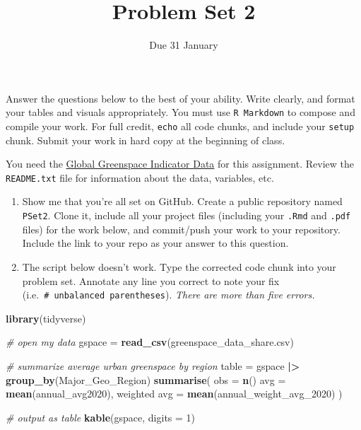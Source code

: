 \documentclass[
  12pt,
]{article}
\title{Problem Set 2}
\author{Due 31 January}
\date{}
\newenvironment{Shaded}{\begin{snugshade}}{\end{snugshade}}
\newcommand{\AttributeTok}[1]{\textcolor[rgb]{0.13,0.29,0.53}{#1}}
\newcommand{\CommentTok}[1]{\textcolor[rgb]{0.56,0.35,0.01}{\textit{#1}}}
\newcommand{\DecValTok}[1]{\textcolor[rgb]{0.00,0.00,0.81}{#1}}
\newcommand{\FunctionTok}[1]{\textcolor[rgb]{0.13,0.29,0.53}{\textbf{#1}}}
\newcommand{\NormalTok}[1]{#1}
\newcommand{\OtherTok}[1]{\textcolor[rgb]{0.56,0.35,0.01}{#1}}
\newcommand{\SpecialCharTok}[1]{\textcolor[rgb]{0.81,0.36,0.00}{\textbf{#1}}}
\begin{document}
\maketitle

Answer the questions below to the best of your ability. Write clearly,
and format your tables and visuals appropriately. You must use
\texttt{R\ Markdown} to compose and compile your work. For full credit,
\texttt{echo} all code chunks, and include your \texttt{setup} chunk.
Submit your work in hard copy at the beginning of class.

You need the
\href{https://dataverse.harvard.edu/dataset.xhtml?persistentId=doi:10.7910/DVN/TMWYHB}{Global
Greenspace Indicator Data} for this assignment. Review the
\texttt{README.txt} file for information about the data, variables, etc.

\begin{enumerate}
\def\labelenumi{\arabic{enumi}.}
\item
  Show me that you're all set on GitHub. Create a public repository
  named \texttt{PSet2}. Clone it, include all your project files
  (including your \texttt{.Rmd} and \texttt{.pdf} files) for the work
  below, and commit/push your work to your repository. Include the link
  to your repo as your answer to this question.
\item
  The script below doesn't work. Type the corrected code chunk into your
  problem set. Annotate any line you correct to note your fix
  (i.e.~\texttt{\#\ unbalanced\ parentheses}). \emph{There are more than
  five errors.}
\end{enumerate}

\begin{Shaded}
\begin{Highlighting}[]
  \FunctionTok{library}\NormalTok{(tidyverse)}

\CommentTok{\# open my data}
\NormalTok{  gspace }\OtherTok{=} \FunctionTok{read\_csv}\NormalTok{(greenspace\_data\_share.csv)}

\CommentTok{\# summarize average urban greenspace by region}
\NormalTok{  table }\OtherTok{=} 
\NormalTok{    gspace }\SpecialCharTok{|\textgreater{}}
    \FunctionTok{group\_by}\NormalTok{(Major\_Geo\_Region)}
    \FunctionTok{summarise}\NormalTok{(}
      \AttributeTok{obs =} \FunctionTok{n}\NormalTok{()}
      \AttributeTok{avg =} \FunctionTok{mean}\NormalTok{(annual\_avg2020),}
\NormalTok{      weighted }\AttributeTok{avg =} \FunctionTok{mean}\NormalTok{(annual\_weight\_avg\_2020)}
\NormalTok{    )}

\CommentTok{\# output as table}
  \FunctionTok{kable}\NormalTok{(gspace, }\AttributeTok{digits =} \DecValTok{1}\NormalTok{)}
\end{Highlighting}
\end{Shaded}
\end{document}
